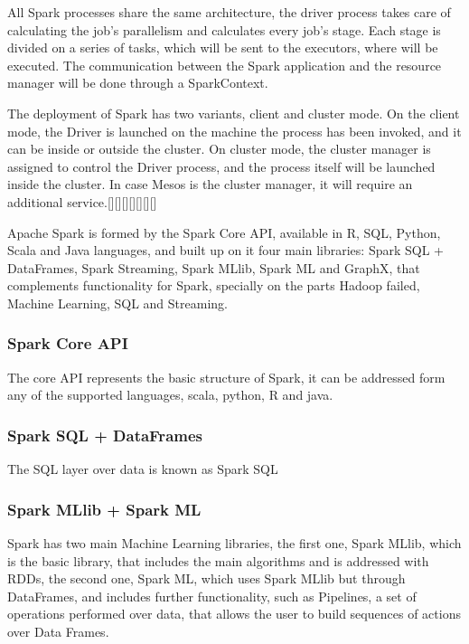\documentclass[11pt]{article} %
\begin{document}
      All Spark processes share the same architecture, the driver process takes care of calculating the job's parallelism and calculates every job's stage. Each stage is divided on a series of tasks, which will be sent to the executors, where will be executed. The communication between the Spark application and the resource manager will be done through a SparkContext.

      The deployment of Spark has two variants, client and cluster mode. On the client mode, the Driver is launched on the machine the process has been invoked, and it can be inside or outside the cluster. On cluster mode, the cluster manager is assigned to control the Driver process, and the process itself will be launched inside the cluster. In case Mesos is the cluster manager, it will require an additional service.[][][][][][][]

      Apache Spark is formed by the Spark Core API, available in R, SQL, Python, Scala and Java languages, and built up on it four main libraries: Spark SQL + DataFrames, Spark Streaming, Spark MLlib, Spark ML and GraphX, that complements functionality for Spark, specially on the parts Hadoop failed, Machine Learning, SQL and Streaming.



      \subsubsection*{Spark Core API}

        The core API represents the basic structure of Spark, it can be addressed form any of the supported languages, scala, python, R and java.

      \subsubsection*{Spark SQL + DataFrames}

        The SQL layer over data is known as Spark SQL

      \subsubsection*{Spark MLlib + Spark ML}

        Spark has two main Machine Learning libraries, the first one, Spark MLlib, which is the basic library, that includes the main algorithms and is addressed with RDDs, the second one, Spark ML, which uses Spark MLlib but through DataFrames, and includes further functionality, such as Pipelines, a set of operations performed over data, that allows the user to build sequences of actions over Data Frames.
\end{document}
